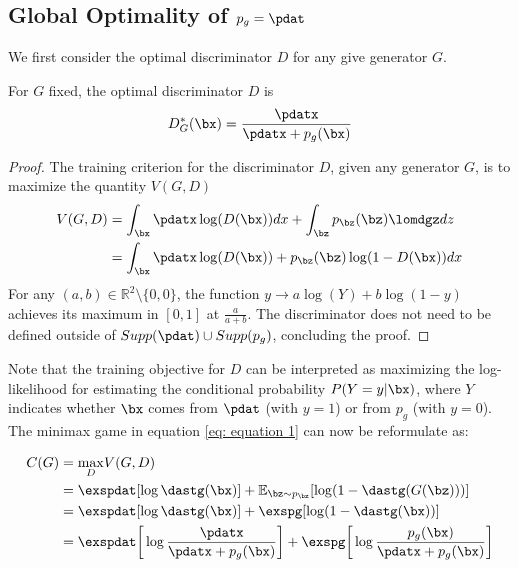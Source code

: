 \subsection{Global Optimality of $p_g = \pdat$}\label{sec: global opt}

We first consider the optimal discriminator $D$ for any give generator $G$.

\begin{proposition}
	For $G$ fixed, the optimal discriminator $D$ is
	\begin{equation}
		D^{\ast}_G(\bx) = \frac{\pdatx}{\pdatx + p_g(\bx)}\label{eq: equation 2}
	\end{equation}
\end{proposition}

\begin{proof}
	The training criterion for the discriminator $D$, given any generator $G$, is to maximize the quantity $V(G, D)$
	\begin{align}
		V(G, D) &= \int_{\bx}{\pdatx}\log(D(\bx))dx + \int_{\bz}{p_{\bz}(\bz)\lomdgz}dz\nonumber\\
		&= \int_{\bx}{\pdatx\log(D(\bx)) + p_{\bz}(\bz)\log(1 - D(\bx))}dx \label{eq: equation 3}
	\end{align}
	For any $(a, b) \in \mathbb{R}^2 \setminus \{0,0\}$, the function $y\rightarrow a\log(Y)+ b\log(1-y)$ achieves its maximum in $[0,1]$ at $\frac{a}{a+b}$. The discriminator does not need to be defined outside of $Supp(\pdat)\cup Supp(p_g)$, concluding the proof.
\end{proof}

\noindent Note that the training objective for $D$ can be interpreted as maximizing the log-likelihood for estimating the conditional probability $P(Y=y|\bx)$, where $Y$ indicates whether $\bx$ comes from $\pdat$ (with $y=1$) or from $p_g$ (with $y=0$). The minimax game in equation \ref{eq: equation 1} can now be reformulate as:

\begin{align}
	C(G) &= \underset{D}{\max}V(G,D)\nonumber\\
	&= \exspdat[\log \dastg(\bx)] + \mathbb{E}_{\bz\sim p_{\bz}}[\log(1-\dastg(G(\bz)))]\label{eq: equation 4} \\
	&= \exspdat[\log \dastg(\bx)] + \exspg[\log(1-\dastg(\bx))]\nonumber\\
	&= \exspdat\bigg[\log\frac{\pdatx}{\pdatx+p_g(\bx)}\bigg]+\exspg\bigg[\log\frac{p_g(\bx)}{\pdatx+p_g(\bx)}\bigg]\nonumber
\end{align}

